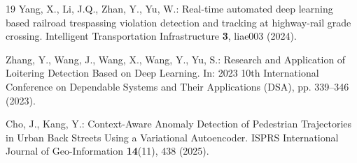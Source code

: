\documentclass[runningheads]{llncs}
\begin{document}
\begin{thebibliography}{19}
Yang, X., Li, J.Q., Zhan, Y., Yu, W.: Real-time automated deep learning based railroad trespassing violation detection and tracking at highway-rail grade crossing. Intelligent Transportation Infrastructure \textbf{3}, liae003 (2024). 

Zhang, Y., Wang, J., Wang, X., Wang, Y., Yu, S.: Research and Application of Loitering Detection Based on Deep Learning. In: 2023 10th International Conference on Dependable Systems and Their Applications (DSA), pp. 339--346 (2023). 

Cho, J., Kang, Y.: Context-Aware Anomaly Detection of Pedestrian Trajectories in Urban Back Streets Using a Variational Autoencoder. ISPRS International Journal of Geo-Information \textbf{14}(11), 438 (2025). 


\end{thebibliography}
\end{document}
